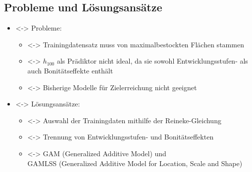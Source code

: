 \subsection{Probleme und Lösungsansätze}
\begin{frame}[c]
  \begin{itemize}
  \item<\theFirstElement-> Probleme:
    \begin{itemize}
    \item<\theFirstElement-> Trainingdatensatz muss von maximalbestockten Flächen stammen
    \item<\theSecondElement-> \(h_{100}\) als Prädiktor nicht ideal, da sie sowohl Entwicklungsstufen- als auch Bonitätseffekte enthält
    \item<\theThirdElement-> Bisherige Modelle für Zielerreichung nicht geeignet
    \end{itemize}
  \end{itemize}
  \begin{itemize}
  \item<\theFirstElement-> Lösungsansätze:
    \begin{itemize}
    \item<\theFirstElement-> Auswahl der Trainingdaten mithilfe der Reineke-Gleichung
    \item<\theSecondElement-> Trennung von Entwicklungsstufen- und Bonitätseffekten
    \item<\theThirdElement-> GAM (Generalized Additive Model) und \\
      GAMLSS (Generalized Additive Model for Location, Scale and Shape)
    \end{itemize}
  \end{itemize}
\end{frame}

